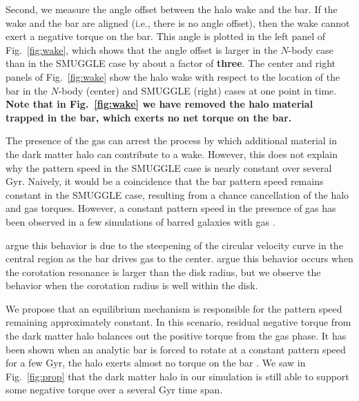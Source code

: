\documentclass[twocolumn,linenumbers,trackchanges]{aastex631}
\newcommand{\Nbody}{$N$-body}
\newcommand{\SMUGGLE}{SMUGGLE}
\begin{document}
Second, we measure the angle offset between the halo wake and the bar. If the
wake and the bar are aligned (i.e., there is no angle offset), then the wake
cannot exert a negative torque on the bar. This angle is plotted in the left
panel of Fig.~\ref{fig:wake}, which shows that the angle offset is larger in the
\Nbody{} case than in the \SMUGGLE{} case by about a factor of {\bf three}. The
center and right panels of Fig.~\ref{fig:wake} show the halo wake with respect
to the location of the bar in the \Nbody{} (center) and \SMUGGLE{} (right) cases
at one point in time. {\bf Note that in Fig.~\ref{fig:wake} we have removed the
halo material trapped in the bar, which exerts no net torque on the bar.}

The presence of the gas can arrest the process by which additional material in
the dark matter halo can contribute to a wake. However, this does not explain
why the pattern speed in the \SMUGGLE{} case is nearly constant over several
Gyr. Naively, it would be a coincidence that the bar pattern speed remains
constant in the \SMUGGLE{} case, resulting from a chance cancellation of the
halo and gas torques. However, a constant pattern speed in the presence of gas
has been observed in a few simulations of barred galaxies with gas
\citep{1993AA...268...65F, 2007ApJ...666..189B, 2009ApJ...707..218V,
2010ApJ...719.1470V, 2014MNRAS.438L..81A}.

\citet{1993AA...268...65F} argue this behavior is due to the steepening of the
circular velocity curve in the central region as the bar drives gas to the
center. \citet{2009ApJ...707..218V} argue this behavior occurs when the
corotation resonance is larger than the disk radius, but we observe the behavior
when the corotation radius is well within the disk.


We propose that an equilibrium mechanism is responsible for the pattern speed
remaining approximately constant. In this scenario, residual negative torque
from the dark matter halo balances out the positive torque from the gas phase.
It has been shown when an analytic bar is forced to rotate at a constant pattern
speed for a few Gyr, the halo exerts almost no torque on the bar
\citep{2022MNRAS.513..768C}. We saw in Fig.~\ref{fig:prop} that the dark matter
halo in our simulation is still able to support some negative torque over a
several Gyr time span.
\end{document}

